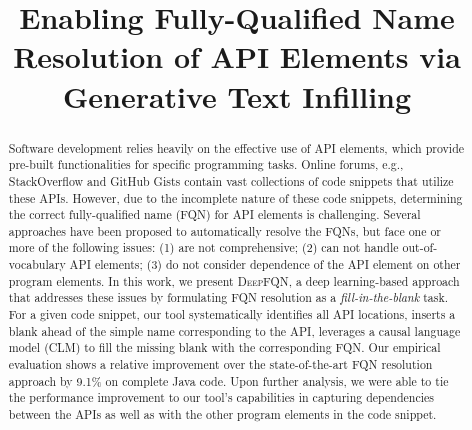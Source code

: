 \documentclass[conference]{IEEEtran}
\newcommand{\tool}{\textsc{DeepFQN}\xspace}
\begin{document}


\title{Enabling Fully-Qualified Name Resolution of API Elements via Generative Text Infilling}


\maketitle

\begin{abstract}

Software development relies heavily on the effective use of API elements, which provide pre-built functionalities for specific programming tasks. Online forums, e.g., StackOverflow and GitHub Gists contain vast collections of code snippets that utilize these APIs. However, due to the incomplete nature of these code snippets, determining the correct fully-qualified name (FQN) for API elements is challenging. Several approaches have been proposed to automatically resolve the FQNs, but face one or more of the following issues: (1) are not comprehensive; (2) can not handle out-of-vocabulary API elements; (3) do not consider dependence of the API element on other program elements. In this work, we  present {\tool}, a deep learning-based approach that addresses these issues by formulating FQN resolution as a \textit{fill-in-the-blank} task. For a given code snippet, our tool systematically identifies all API locations, inserts a blank ahead of the simple name corresponding to the API, leverages a causal language model (CLM) to fill the missing blank with the corresponding FQN.
Our empirical evaluation shows a relative improvement over the state-of-the-art FQN resolution approach by 9.1\% on complete Java code. Upon further analysis, we were able to tie the performance improvement to our tool's capabilities in capturing dependencies between the APIs as well as with the other program elements in the code snippet.  

\end{abstract}
\end{document}
